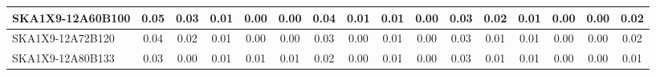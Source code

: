 \begin{table}[H]
{{\begin{tabular}{|lccccc||ccccc||ccccc|}
SKA1X9-12A60B100 & 0.05 \cellcolor{blue!60.00} & 0.03 \cellcolor{red!60.00} & 0.01 \cellcolor{green!60.00} & 0.00 \cellcolor{orange!18.00} & 0.00 \cellcolor{purple!18.00} & 0.04 \cellcolor{blue!60.00} & 0.01 \cellcolor{red!39.00} & 0.01 \cellcolor{green!60.00} & 0.00 \cellcolor{orange!18.00} & 0.03 \cellcolor{purple!18.00} & 0.02 \cellcolor{blue!39.00} & 0.01 \cellcolor{red!60.00} & 0.00 \cellcolor{green!18.00} & 0.00 \cellcolor{orange!18.00} & 0.02 \cellcolor{purple!28.50}\\ \hline 
SKA1X9-12A72B120 & 0.04 \cellcolor{blue!39.00} & 0.02 \cellcolor{red!46.00} & 0.01 \cellcolor{green!60.00} & 0.00 \cellcolor{orange!18.00} & 0.00 \cellcolor{purple!18.00} & 0.03 \cellcolor{blue!39.00} & 0.00 \cellcolor{red!18.00} & 0.01 \cellcolor{green!60.00} & 0.00 \cellcolor{orange!18.00} & 0.03 \cellcolor{purple!18.00} & 0.01 \cellcolor{blue!18.00} & 0.01 \cellcolor{red!60.00} & 0.00 \cellcolor{green!18.00} & 0.00 \cellcolor{orange!18.00} & 0.02 \cellcolor{purple!28.50}\\ \hline 
SKA1X9-12A80B133 & 0.03 \cellcolor{blue!18.00} & 0.00 \cellcolor{red!18.00} & 0.01 \cellcolor{green!60.00} & 0.01 \cellcolor{orange!60.00} & 0.01 \cellcolor{purple!60.00} & 0.02 \cellcolor{blue!18.00} & 0.00 \cellcolor{red!18.00} & 0.01 \cellcolor{green!60.00} & 0.00 \cellcolor{orange!18.00} & 0.03 \cellcolor{purple!18.00} & 0.01 \cellcolor{blue!18.00} & 0.01 \cellcolor{red!60.00} & 0.00 \cellcolor{green!18.00} & 0.00 \cellcolor{orange!18.00} & 0.01 \cellcolor{purple!18.00}\\ \hline 
\end{tabular}}
\vspace{-0.300000cm}
\hspace{1cm} 
}
\end{table}
